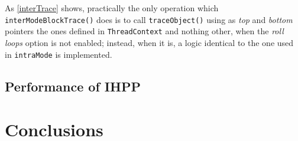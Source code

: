 \documentclass[a4paper,10pt]{report}
\begin{document}
\noindent
As \cref{interTrace} shows, practically the only operation 
which \verb|interModeBlockTrace()| does is to call \verb|traceObject()|
using as \emph{top} and \emph{bottom} pointers the ones defined in \verb|ThreadContext|
and nothing other, when the \emph{roll loops} option is not enabled;
instead, when it is, a logic identical to the one used in \verb|intraMode| is implemented.

\section{Performance of IHPP}

\chapter{Conclusions}

{}

\end{document}
